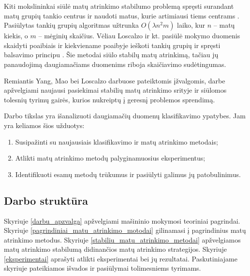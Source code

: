 Kiti mokslininkai siūlė matų atrinkimo stabilumo problemą spręsti surandant matų grupių tankio centrus ir naudoti matus, kurie artimiausi tiems centrams \cite{yu2008stable}. Pasiūlytas tankių grupių algoritmas užtrunka $O(\lambda n^2m)$ laiko, kur $n$ -- matų kiekis, o $m$ -- mėginių skaičius. Vėliau Loscalzo ir kt. pasiūlė mokymo duomenis skaidyti poaibiais ir kiekviename poaibyje ieškoti tankių grupių ir spręsti balsavimo principu \cite{loscalzo2009consensus}. Šie metodai siūlo stabilų matų atrinkimą, tačiau jų panaudojimą daugiamačiams duomenims riboja skaičiavimo sudėtingumas.

Remiantis Yang, Mao bei Loscalzo darbuose pateiktomis įžvalgomis, darbe apžvelgiami naujausi pasiekimai stabilių matų atrinkimo srityje ir siūlomos tolesnių tyrimų gairės, kurios nukreiptų į geresnį problemos sprendimą.

Darbo tikslas yra išanalizuoti daugiamačių duomenų klasifikavimo ypatybes. Jam yra keliamos šios užduotys:
\begin{enumerate}
 \item Susipažinti su naujausiais klasifikavimo ir matų atrinkimo metodais;
 \item Atlikti matų atrinkimo metodų palyginamuosius eksperimentus;
 \item Identifikuoti esamų metodų trūkumus ir pasiūlyti galimus jų patobulinimus.
\end{enumerate}

\subsection*{Darbo struktūra}

Skyriuje \ref{darbu_apzvalga} apžvelgiami mašininio mokymosi teoriniai pagrindai. Skyriuje \ref{pagrindiniai_matu_atrinkimo_motodai} gilinamasi į pagrindinius matų atrinkimo metodus. Skyriuje \ref{stabiliu_matu_atrinkimo_metodai} apžvelgiamos matų atrinkimo stabilumą didinančios matų atrinkimo strategijos. Skyriuje \ref{eksperimentai} aprašyti atlikti eksperimentai bei jų rezultatai. Paskutiniajame skyriuje pateikiamos išvados ir pasiūlymai tolimesniems tyrimams.
